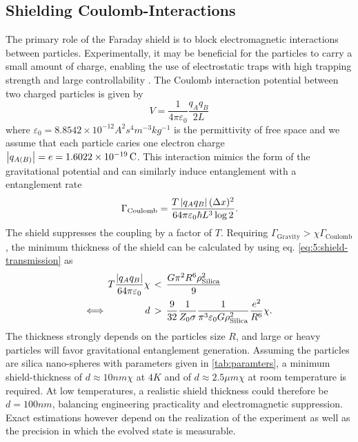 \subsection{Shielding Coulomb-Interactions}
The primary role of the Faraday shield is to block electromagnetic interactions between particles.
Experimentally, it may be beneficial for the particles to carry a small amount of charge, enabling the use of electrostatic traps with high trapping strength and large controllability \cite{GonzalezBallestero_2021}. 
The Coulomb interaction potential between two charged particles is given by
\begin{equation}
  V = \frac{1}{4\pi\varepsilon_0} \frac{q_A q_B}{2L}
\end{equation}
where $\varepsilon_0 = 8.8542\times 10^{-12}\si{A^2 s^4 m^{-3} kg^{-1}}$ is the permittivity of free space and we assume that each particle caries one electron charge $\left\lvert q_{A(B)}\right\rvert = e = 1.6022\times 10^{-19}\, \mathrm{C}$.
This interaction mimics the form of the gravitational potential and can similarly induce entanglement with a entanglement rate
\begin{equation}\label{eq:5:entanglement-rate-coulomb}
  \Gamma_\mathrm{Coulomb} = \frac{T \left\lvert q_A q_B\right\rvert (\Delta x)^2}{64 \pi \varepsilon_0 \hbar L^3 \log 2} .
\end{equation}
The shield suppresses the coupling by a factor of $T$.
Requiring $\Gamma_\mathrm{Gravity} > \chi \Gamma_\mathrm{Coulomb}$, the minimum thickness of the shield can be calculated by using eq. \eqref{eq:5:shield-transmission} as
\begin{align}\label{eq:5:coulomb-gravity-condition}
  T \frac{\left\lvert q_A q_B\right\rvert}{64 \pi \varepsilon_0} \chi \, &< \, \frac{G \pi^2 R^6 \rho_\mathrm{Silica}^2}{9} \\
  \Longleftrightarrow \quad\quad\quad\quad d \, &> \, \frac{9}{32}\frac{1}{Z_0 \sigma} \frac{1}{\pi^3 \varepsilon_0 G \rho_\mathrm{Silica}^2} \frac{e^2}{R^6} \chi .
\end{align}
The thickness strongly depends on the particles size $R$, and large or heavy particles will favor gravitational entanglement generation.
Assuming the particles are silica nano-spheres with parameters given in \cref{tab:paramters}, a minimum shield-thickness of $d \approx 10\si{nm}\chi$ at $4\si{K}$ and of $d \approx 2.5\si{\mu m}\chi$ at room temperature is required.
At low temperatures, a realistic shield thickness could therefore be $d=100\si{nm}$, balancing engineering practicality and electromagnetic suppression.
Exact estimations however depend on the realization of the experiment as well as the precision in which the evolved state is measurable.

